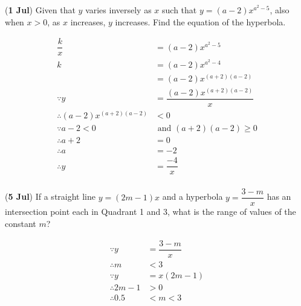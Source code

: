\documentclass[12pt, answers]{exam}
\renewcommand{\frac}[2]{\dfrac{#1}{#2}}
\newcommand{\qndate}[2]{(\textbf{#1 #2})}
\begin{document}
\begin{questions}
	\question \qndate{1}{Jul} Given that $y$ varies inversely as $x$ such that
	$y = \left(a-2\right){x}^{a^2-5}$, also when $x>0$, as $x$ increases, $y$
	increases. Find the equation of the hyperbola.
	\begin{solution}
		\begin{align*}
			\frac{k}{x}                                 & = \left(a-2\right){x}^{a^2-5}                \\
			k                                           & = \left(a-2\right){x}^{a^2-4}                \\
			                                            & = \left(a-2\right){x}^{(a+2)(a-2)}           \\
			\because y                                  & = \frac{\left(a-2\right){x}^{(a+2)(a-2)}}{x} \\
			\therefore \left(a-2\right){x}^{(a+2)(a-2)} & < 0                                          \\
			\because a - 2 < 0                          & \text{ and } (a+2)(a-2) \geq 0               \\
			\therefore a + 2                            & = 0                                          \\
			\therefore a                                & = -2                                         \\
			\therefore y                                & = \frac{-4}{x}                               \\
		\end{align*}
	\end{solution}

	\question \qndate{5}{Jul} If a straight line $y = (2m - 1)x$ and a hyperbola
	$y = \frac{3-m}{x}$ has an intersection point each in Quadrant 1 and 3, what
	is the range of values of the constant $m$?
	\begin{solution}
		\begin{align*}
			\because y        & = \frac{3-m}{x} \\
			\therefore m      & < 3             \\
			\because y        & = x(2m - 1)     \\
			\therefore 2m - 1 & > 0             \\
			\therefore 0.5    & < m < 3
		\end{align*}
	\end{solution}


\end{questions}
\end{document}
